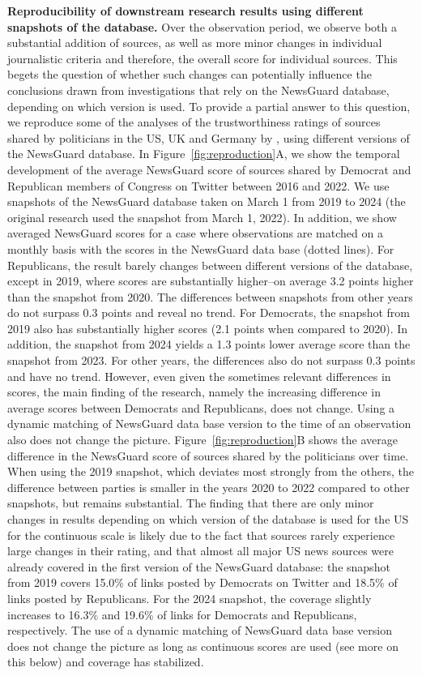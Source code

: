 \documentclass[12pt,twoside]{article}
\begin{document}
\newpage
\textbf{Reproducibility of downstream research results using different snapshots of the database.}
Over the observation period, we observe both a substantial addition of sources, as well as more minor changes in individual journalistic criteria and therefore, the overall score for individual sources. 
This begets the question of whether such changes can potentially influence the conclusions drawn from investigations that rely on the NewsGuard database, depending on which version is used.
To provide a partial answer to this question, we reproduce some of the analyses of the trustworthiness ratings of sources shared by politicians in the US, UK and Germany by \cite{lasserSocialMediaSharing2022c}, using different versions of the NewsGuard database.
In Figure~\ref{fig:reproduction}A, we show the temporal development of the average NewsGuard score of sources shared by Democrat and Republican members of Congress on Twitter between 2016 and 2022.
We use snapshots of the NewsGuard database taken on March 1 from 2019 to 2024 (the original research used the snapshot from March 1, 2022).
In addition, we show averaged NewsGuard scores for a case where observations are matched on a monthly basis with the scores in the NewsGuard data base (dotted lines).
For Republicans, the result barely changes between different versions of the database, except in 2019, where scores are substantially higher--on average 3.2 points higher than the snapshot from 2020.
The differences between snapshots from other years do not surpass 0.3 points and reveal no trend. 
For Democrats, the snapshot from 2019 also has substantially higher scores (2.1 points when compared to 2020).
In addition, the snapshot from 2024 yields a 1.3 points lower average score than the snapshot from 2023. 
For other years, the differences also do not surpass 0.3 points and have no trend.
However, even given the sometimes relevant differences in scores, the main finding of the research, namely the increasing difference in average scores between Democrats and Republicans, does not change.
Using a dynamic matching of NewsGuard data base version to the time of an observation also does not change the picture.
Figure~\ref{fig:reproduction}B shows the average difference in the NewsGuard score of sources shared by the politicians over time. 
When using the 2019 snapshot, which deviates most strongly from the others, the difference between parties is smaller in the years 2020 to 2022 compared to other snapshots, but remains substantial.
The finding that there are only minor changes in results depending on which version of the database is used for the US for the continuous scale is likely due to the fact that sources rarely experience large changes in their rating, and that almost all major US news sources were already covered in the first version of the NewsGuard database: the snapshot from 2019 covers 15.0\% of links posted by Democrats on Twitter and 18.5\% of links posted by Republicans. 
For the 2024 snapshot, the coverage slightly increases to 16.3\% and 19.6\% of links for Democrats and Republicans, respectively.
The use of a dynamic matching of NewsGuard data base version does not change the picture as long as continuous scores are used (see more on this below) and coverage has stabilized. 
\end{document}
